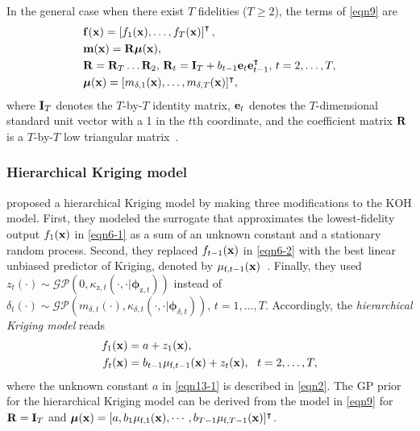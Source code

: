 \documentclass[iicol,sn-basic]{sn-jnl}%
\begin{document}
In the general case when there exist $T$ fidelities ($T \geq 2$), the terms of \cref{eqn9} are
\begin{subequations}\label{eqn12}
	\begin{align}
		&{\bf f}({\bf x}) = \left[f_1({\bf x}),\dots,f_T({\bf x})\right]^\intercal, \label{eqn12-1}\\
		& {\bf m}({\bf x}) = {\bf R} \boldsymbol{\mu}({\bf x}), \label{eqn12-2}\\
		& {\bf R} = {\bf R}_T\dots {\bf R}_2, \, {\bf R}_t = {\bf I}_T + b_{t-1} {\bf e}_t {\bf e}^\intercal_{t-1}, \, t=2,\dots,T, \label{eqn12-3}\\
 		& \boldsymbol{\mu}({\bf x}) = [m_{\delta,1}({\bf x}),\dots,m_{\delta,T}({\bf x})]^\intercal \label{eqn12-4},
	\end{align}
\end{subequations}
where ${\bf I}_T$ denotes the $T$-by-$T$ identity matrix, ${\bf e}_t$ denotes the $T$-dimensional standard unit vector with a 1 in the $t$th coordinate, and the coefficient matrix ${\bf R}$ is a $T$-by-$T$ low triangular matrix~\citep{Garland2020}.

\subsubsection{Hierarchical Kriging model}\label{Sec422}

\cite{Han2012} proposed a hierarchical Kriging model by making three modifications to the KOH model.
First, they modeled the surrogate that approximates the lowest-fidelity output $f_1({\bf x})$ in \cref{eqn6-1} as a sum of an unknown constant and a stationary random process.
Second, they replaced $f_{t-1}({\bf x})$ in \cref{eqn6-2} with the best linear unbiased predictor of Kriging, denoted by $\mu_{\text{f},t-1}({\bf x})$~\citep{Sacks1989}.
Finally, they used $z_t({\cdot}) \sim \mathcal{GP}\left(0,\kappa_{\text{z},t}(\cdot,\cdot|{\boldsymbol \phi}_{\text{z},t})\right)$ instead of $\delta_{t}(\cdot) \sim \mathcal{GP}\left(m_{\delta,t}(\cdot),\kappa_{\delta,t}(\cdot,\cdot|{\boldsymbol \phi}_{\delta,t})\right)$, $t=1,\dots,T$.
Accordingly, the \textit{hierarchical Kriging model} reads
\begin{subequations}\label{eqn13}
	\begin{align}
		f_1({\bf x}) & = a + z_1({\bf x}) 
		\label{eqn13-1},\\
		f_t({\bf x}) & =
		b_{t-1} \mu_{\text{f},t-1}({\bf x}) + z_{t}({\bf x}), \ \  t=2,\dots,T
		\label{eqn13-2},
	\end{align}
\end{subequations}
where the unknown constant $a$ in \cref{eqn13-1} is described in \cref{eqn2}.
The GP prior for the hierarchical Kriging model can be derived from the model in \cref{eqn9} for ${\bf R}={\bf I}_T$ and $\boldsymbol{\mu}({\bf x}) = [a,b_1 \mu_{\text{f},1}({\bf x}),\cdots,b_{T-1} \mu_{\text{f},T-1}({\bf x})]^\intercal$.
\end{document}
